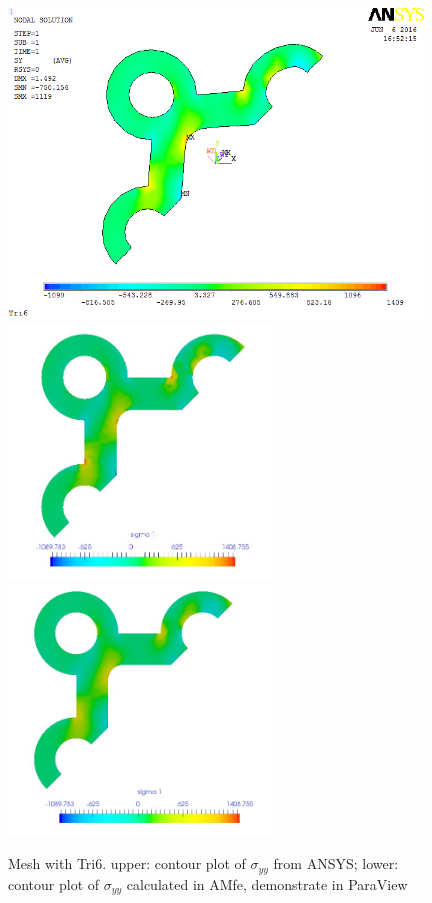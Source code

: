 \begin{figure}[htbp]
	\begin{center}
		\includegraphics[width=11cm,clip]{Tri6_Syy.png} 	
		\includegraphics[width=7cm,clip]{Tri6_Syy_PD.png} 		
		\includegraphics[width=7cm,clip]{Tri6_Syy_P.png} 		
		\caption{Mesh with Tri6. upper: contour plot of $\sigma_{yy}$ from ANSYS; lower: contour plot of $\sigma_{yy}$ calculated in AMfe, demonstrate in ParaView} \label{fig: Tri6_Syy}
	\end{center}
\end{figure}
\clearpage 

